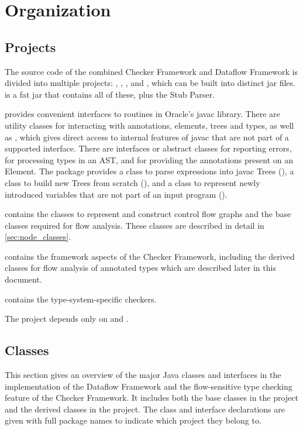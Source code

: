 \section{Organization}

\subsection{Projects}

The source code of the combined Checker Framework and Dataflow
Framework is divided into multiple projects: ,
, , and ,
which can be built into distinct jar files.   is a fat
jar that contains all of these, plus the Stub Parser.

 provides convenient interfaces to routines in
Oracle's javac library.  There are utility classes for interacting
with annotations, elements, trees and types, as well as
, which gives direct access to internal features
of javac that are not part of a supported interface.  There are
interfaces or abstract classes for reporting errors, for processing
types in an AST, and for providing the annotations present on an
Element.
The  package provides a
class to parse expressions into javac Trees (), a
class to build new Trees from scratch (), and a
class to represent newly introduced variables that are not part of an
input program ().

 contains the classes to represent and construct
control flow graphs and the base classes required for flow analysis.
These classes are described in detail in \autoref{sec:node_classes}.

 contains the framework aspects of the Checker
Framework, including the derived classes for flow analysis of
annotated types which are described later in this document.

 contains the type-system-specific checkers.

The  project depends only on  and
.


\subsection{Classes}

This section gives an overview of the major Java classes and
interfaces in the implementation of the Dataflow Framework and the
flow-sensitive type checking feature of the Checker Framework.  It
includes both the base classes in the  project and the
derived classes in the  project.  The class and
interface declarations are given with full package names to indicate
which project they belong to.

